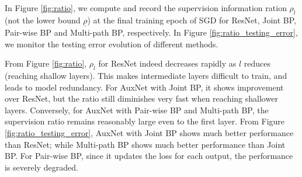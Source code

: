 \documentclass[10pt,onecolumn,letterpaper]{article}
\def\bg{{\bf g}}
\def\bx{{\bf x}}
\def\SexyName{AuxNet\xspace}
\begin{document}
In Figure \ref{fig:ratio}, we compute and record the supervision information ration $\rho_l$ (not the lower bound $\underline{\rho}$) at the
final training epoch of SGD for ResNet, Joint BP, Pair-wise BP and Multi-path BP, respectively. In Figure \ref{fig:ratio_testing_error}, we monitor the testing error evolution of different methods.

From Figure \ref{fig:ratio}, $\rho_l$ for ResNet indeed decreases rapidly as $l$ reduces (reaching shallow layers). This makes intermediate layers difficult to train, and leads to model redundancy. For \SexyName with Joint BP, it shows improvement over ResNet, but the ratio still diminishes very fast when reaching shallower layers. Conversely, for \SexyName with  Pair-wise BP and Multi-path BP, the supervision ratio remains reasonably large even to the first layer. From Figure \ref{fig:ratio_testing_error}, \SexyName with Joint BP  shows much better performance than ResNet; while Multi-path BP shows much better performance than Joint BP. For Pair-wise BP, since it updates the loss for each output, the performance is severely degraded. %





\end{document}
